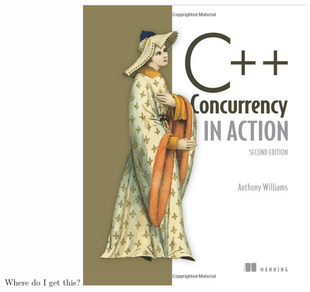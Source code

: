 \begin{frame}[t]{Where do I get this?}
\includegraphics[height=.9\textwidth]{images/williams-book.png}
\end{frame}
